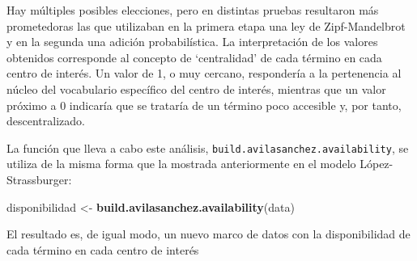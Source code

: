 \documentclass[
]{article}
\newenvironment{Shaded}{\begin{snugshade}}{\end{snugshade}}
\newcommand{\KeywordTok}[1]{\textcolor[rgb]{0.13,0.29,0.53}{\textbf{#1}}}
\newcommand{\NormalTok}[1]{#1}
\newcommand{\StringTok}[1]{\textcolor[rgb]{0.31,0.60,0.02}{#1}}
\begin{document}
Hay múltiples posibles elecciones, pero en distintas pruebas resultaron
más prometedoras las que utilizaban en la primera etapa una ley de
Zipf-Mandelbrot y en la segunda una adición probabilística. La
interpretación de los valores obtenidos corresponde al concepto de
`centralidad' de cada término en cada centro de interés. Un valor de 1,
o muy cercano, respondería a la pertenencia al núcleo del vocabulario
específico del centro de interés, mientras que un valor próximo a 0
indicaría que se trataría de un término poco accesible y, por tanto,
descentralizado.

La función que lleva a cabo este análisis,
\texttt{build.avilasanchez.availability}, se utiliza de la misma forma
que la mostrada anteriormente en el modelo López-Strassburger:

\begin{Shaded}
\begin{Highlighting}[]
\NormalTok{disponibilidad <-}\StringTok{ }\KeywordTok{build.avilasanchez.availability}\NormalTok{(data)}
\end{Highlighting}
\end{Shaded}

El resultado es, de igual modo, un nuevo marco de datos con la
disponibilidad de cada término en cada centro de interés
\end{document}
